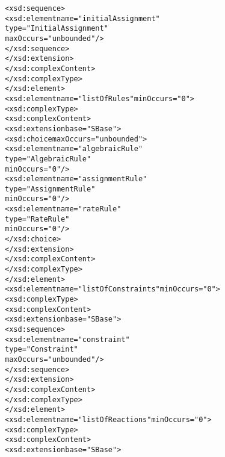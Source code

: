 \begin{alltt}
                                    <xsd:sequence>
                                        <xsd:element name="initialAssignment" 
                                                     type="InitialAssignment" 
                                                     maxOccurs="unbounded"/>
                                    </xsd:sequence>
                                </xsd:extension>
                            </xsd:complexContent>
                        </xsd:complexType>
                    </xsd:element>
                    <xsd:element name="listOfRules" minOccurs="0">
                        <xsd:complexType>
                            <xsd:complexContent>
                                <xsd:extension base="SBase">
                                    <xsd:choice maxOccurs="unbounded">
                                        <xsd:element name="algebraicRule" 
                                                     type="AlgebraicRule" 
                                                     minOccurs="0"/>
                                        <xsd:element name="assignmentRule" 
                                                     type="AssignmentRule" 
                                                     minOccurs="0"/>
                                        <xsd:element name="rateRule" 
                                                     type="RateRule" 
                                                     minOccurs="0"/>
                                    </xsd:choice>
                                </xsd:extension>
                            </xsd:complexContent>
                        </xsd:complexType>
                    </xsd:element>
                    <xsd:element name="listOfConstraints" minOccurs="0">
                        <xsd:complexType>
                            <xsd:complexContent>
                                <xsd:extension base="SBase">
                                    <xsd:sequence>
                                        <xsd:element name="constraint" 
                                                     type="Constraint" 
                                                     maxOccurs="unbounded"/>
                                    </xsd:sequence>
                                </xsd:extension>
                            </xsd:complexContent>
                        </xsd:complexType>
                    </xsd:element>
                    <xsd:element name="listOfReactions" minOccurs="0">
                        <xsd:complexType>
                            <xsd:complexContent>
                                <xsd:extension base="SBase">

\end{alltt}
